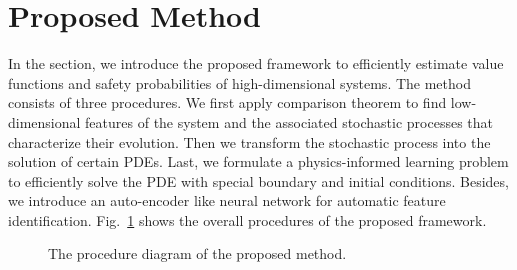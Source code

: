 \documentclass[letterpaper]{article} %
\begin{document}


\section{Proposed Method}
\label{sec:proposed_method}
In the section, we introduce the proposed framework to efficiently estimate value functions and safety probabilities of high-dimensional systems. The method consists of three procedures. We first apply comparison theorem to find low-dimensional features of the system and the associated stochastic processes that characterize their evolution. 
Then we transform the stochastic process into the solution of certain PDEs. 
Last, we formulate a physics-informed learning problem to efficiently solve the PDE with special boundary and initial conditions. Besides, we introduce an auto-encoder like neural network for automatic feature identification. Fig.~\ref{fig:flowchart} shows the overall procedures of the proposed framework.

\begin{figure}[t]
    \centering
    
    \caption{The procedure diagram of the proposed method.}
    \label{fig:flowchart}
\end{figure}

\end{document}
